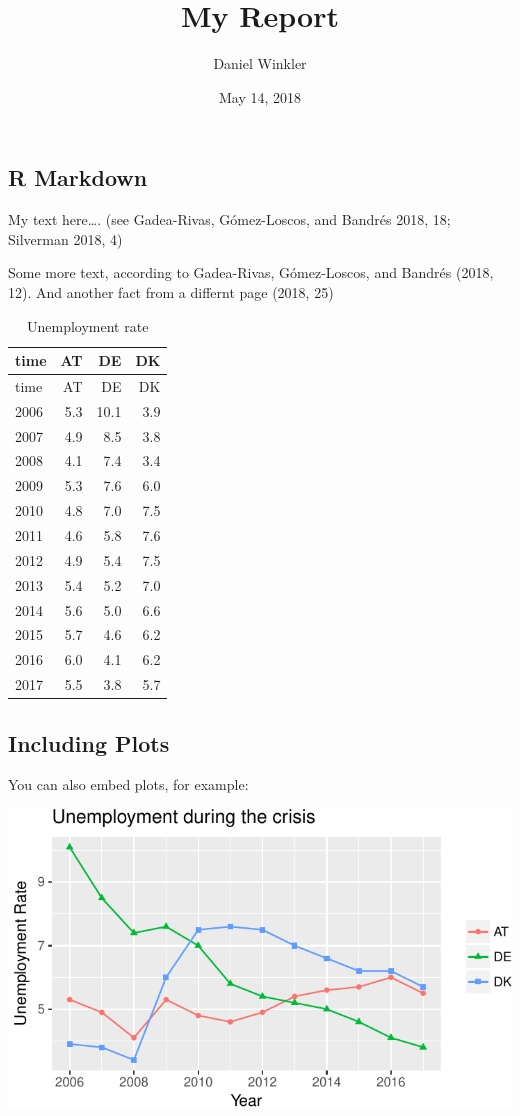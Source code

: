 \documentclass[]{article}
\title{My Report}
\author{Daniel Winkler}
\date{May 14, 2018}
\begin{document}
\maketitle

\subsection{R Markdown}\label{r-markdown}

My text here\ldots{}. (see Gadea-Rivas, Gómez-Loscos, and Bandrés 2018,
18; Silverman 2018, 4)

Some more text, according to Gadea-Rivas, Gómez-Loscos, and Bandrés
(2018, 12). And another fact from a differnt page (2018, 25)

\begin{longtable}[]{@{}lrrr@{}}
\caption{Unemployment rate}\tabularnewline
\toprule
time & AT & DE & DK\tabularnewline
\midrule
\endfirsthead
\toprule
time & AT & DE & DK\tabularnewline
\midrule
\endhead
2006 & 5.3 & 10.1 & 3.9\tabularnewline
2007 & 4.9 & 8.5 & 3.8\tabularnewline
2008 & 4.1 & 7.4 & 3.4\tabularnewline
2009 & 5.3 & 7.6 & 6.0\tabularnewline
2010 & 4.8 & 7.0 & 7.5\tabularnewline
2011 & 4.6 & 5.8 & 7.6\tabularnewline
2012 & 4.9 & 5.4 & 7.5\tabularnewline
2013 & 5.4 & 5.2 & 7.0\tabularnewline
2014 & 5.6 & 5.0 & 6.6\tabularnewline
2015 & 5.7 & 4.6 & 6.2\tabularnewline
2016 & 6.0 & 4.1 & 6.2\tabularnewline
2017 & 5.5 & 3.8 & 5.7\tabularnewline
\bottomrule
\end{longtable}

\subsection{Including Plots}\label{including-plots}

You can also embed plots, for example:

\includegraphics{markdownIntro_files/figure-latex/pressure-1.pdf}
\end{document}
